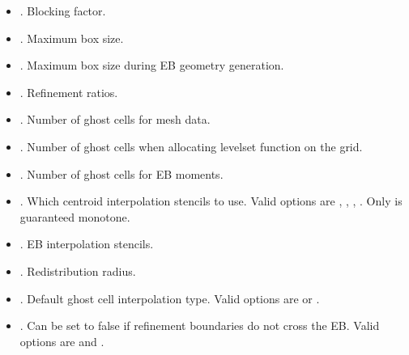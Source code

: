 \documentclass[letterpaper,10pt,english]{sphinxmanual}
\begin{document}
\begin{itemize}
\item {} 
. Blocking factor.

\item {} 
. Maximum box size.

\item {} 
. Maximum box size during EB geometry generation.

\item {} 
. Refinement ratios.

\item {} 
. Number of ghost cells for mesh data.

\item {} 
. Number of ghost cells when allocating level\sphinxhyphen{}set function on the grid.

\item {} 
. Number of ghost cells for EB moments.

\item {} 
. Which centroid interpolation stencils to use. Valid options are , , , . Only  is guaranteed monotone.

\item {} 
. EB interpolation stencils.

\item {} 
. Redistribution radius.

\item {} 
. Default ghost cell interpolation type. Valid options are  or .

\item {} 
. Can be set to false if refinement boundaries do not cross the EB. Valid options are  and .

\end{itemize}
\end{document}
